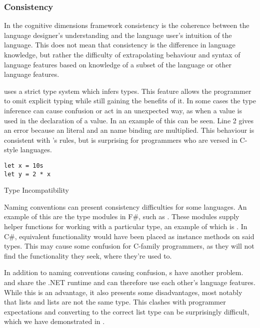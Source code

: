 \subsubsection{Consistency}
In the cognitive dimensions framework consistency is the coherence between the language designer's understanding and the language user's intuition of the language\cite{green1996usability}. This does not mean that consistency is the difference in language knowledge, but rather the difficulty of extrapolating behaviour and syntax of language features based on knowledge of a subset of the language or other language features.

\fs uses a strict type system which infers types. This feature allows the programmer to omit explicit typing while still gaining the benefits of it. In some cases the type inference can cause confusion or act in an unexpected way, as when a  value is used in the declaration of a  value. In  an example of this can be seen. Line 2 gives an error because an  literal and an  name binding are multiplied. This behaviour is consistent with \fs's rules, but is surprising for programmers who are versed in C-style languages.

\begin{listing}[H]
\begin{verbatim}
let x = 10s
let y = 2 * x
\end{verbatim}
\caption{Type Incompatibility}
\label{lst:type-incompat}
\end{listing}

Naming conventions can present consistency difficulties for some languages. An example of this are the type modules in F\#, such as . These modules supply helper functions for working with a particular type, an example of which is . In C\#, equivalent functionality would have been placed as instance methods on said types. This may cause some confusion for C-family programmers, as they will not find the functionality they seek, where they're used to.

In addition to naming conventions causing confusion, s have another problem. \fs and \cs share the .NET runtime and can therefore use each other's language features. While this is an advantage, it also presents some disadvantages, most notably that \fs lists and \cs lists are not the same type. This clashes with programmer expectations and converting to the correct list type can be surprisingly difficult, which we have demonstrated in .

